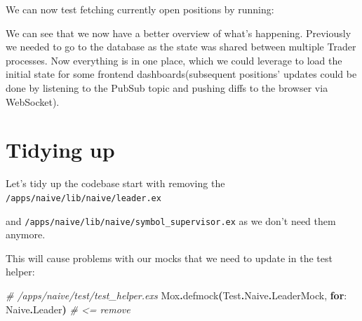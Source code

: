 \documentclass[
  oneside]{book}
\newenvironment{Shaded}{\begin{snugshade}}{\end{snugshade}}
\newcommand{\AttributeTok}[1]{\textcolor[rgb]{0.13,0.29,0.53}{#1}}
\newcommand{\BuiltInTok}[1]{#1}
\newcommand{\CommentTok}[1]{\textcolor[rgb]{0.56,0.35,0.01}{\textit{#1}}}
\newcommand{\ConstantTok}[1]{\textcolor[rgb]{0.56,0.35,0.01}{#1}}
\newcommand{\ErrorTok}[1]{\textcolor[rgb]{0.64,0.00,0.00}{\textbf{#1}}}
\newcommand{\ExtensionTok}[1]{#1}
\newcommand{\FunctionTok}[1]{\textcolor[rgb]{0.13,0.29,0.53}{\textbf{#1}}}
\newcommand{\KeywordTok}[1]{\textcolor[rgb]{0.13,0.29,0.53}{\textbf{#1}}}
\newcommand{\NormalTok}[1]{#1}
\newcommand{\OperatorTok}[1]{\textcolor[rgb]{0.81,0.36,0.00}{\textbf{#1}}}
\newcommand{\StringTok}[1]{\textcolor[rgb]{0.31,0.60,0.02}{#1}}
\begin{document}
We can now test fetching currently open positions by running:

\begin{Shaded}
\end{Shaded}

We can see that we now have a better overview of what's happening. Previously we needed to go to the database as the state was shared between multiple Trader processes. Now everything is in one place, which we could leverage to load the initial state for some frontend dashboards(subsequent positions' updates could be done by listening to the PubSub topic and pushing diffs to the browser via WebSocket).

\section{Tidying up}\label{tidying-up}

Let's tidy up the codebase start with removing the \texttt{/apps/naive/lib/naive/leader.ex}

and \texttt{/apps/naive/lib/naive/symbol\_supervisor.ex} as we don't need them anymore.

This will cause problems with our mocks that we need to update in the test helper:

\begin{Shaded}
\begin{Highlighting}[]
\CommentTok{\# /apps/naive/test/test\_helper.exs}
\ConstantTok{Mox}\OperatorTok{.}\NormalTok{defmock}\FunctionTok{(}\ConstantTok{Test}\OperatorTok{.}\ConstantTok{Naive}\OperatorTok{.}\ConstantTok{LeaderMock}\NormalTok{, }\KeywordTok{for}\NormalTok{: }\ConstantTok{Naive}\OperatorTok{.}\ConstantTok{Leader}\FunctionTok{)} \CommentTok{\# \textless{}= remove}
\end{Highlighting}
\end{Shaded}
\end{document}
